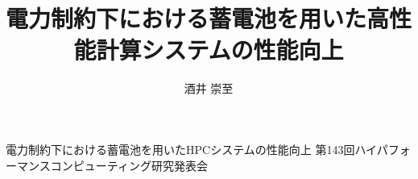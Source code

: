 \documentclass[ipc]{suribt}
\title{電力制約下における蓄電池を用いた高性能計算システムの性能向上}
\author{酒井 崇至}
\begin{document}
\maketitle%

\frontmatter%
\begin{abstract}%

\end{abstract}

\tableofcontents%

\mainmatter%










\backmatter%


\begin{thepublication}{9}
電力制約下における蓄電池を用いたHPCシステムの性能向上 第143回ハイパフォーマンスコンピューティング研究発表会
\end{thepublication}

\end{document}
